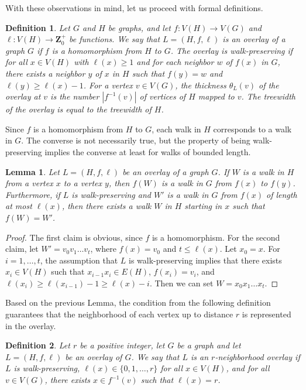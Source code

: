 \documentclass[a4paper,11pt]{article}
\newtheorem{definition}{Definition}
\newtheorem{lemma}[theorem]{Lemma}
\begin{document}
With these observations in mind, let us proceed with formal definitions.

\begin{definition}\label{def-nonp-over}
Let $G$ and $H$ be graphs, and let $f:V(H)\to V(G)$ and $\ell:V(H)\to \mathbf{Z}_0^+$ be functions.
We say that $L=(H,f,\ell)$ is an \emph{overlay} of a graph $G$ if $f$ is a homomorphism from $H$ to $G$.
The overlay is \emph{walk-preserving} if for all $x\in V(H)$ with $\ell(x)\ge 1$ and for each neighbor $w$ of $f(x)$ in $G$,
there exists a neighbor $y$ of $x$ in $H$ such that $f(y)=w$ and $\ell(y)\ge\ell(x)-1$.
For a vertex $v\in V(G)$, the \emph{thickness} $\theta_L(v)$ of the overlay at $v$ is the number $|f^{-1}(v)|$ of vertices
of $H$ mapped to $v$.  The \emph{treewidth} of the overlay is equal to the treewidth of $H$.
\end{definition}

Since $f$ is a homomorphism from $H$ to $G$, each walk in $H$ corresponds to a walk in $G$.
The converse is not necessarily true, but the property of being walk-preserving implies the converse
at least for walks of bounded length.

\begin{lemma}\label{lemma-walk}
Let $L=(H,f,\ell)$ be an overlay of a graph $G$.  If $W$ is a walk in $H$ from a vertex $x$ to a vertex $y$,
then $f(W)$ is a walk in $G$ from $f(x)$ to $f(y)$.
Furthermore, if $L$ is walk-preserving and $W'$ is a walk in $G$ from $f(x)$ of length at most $\ell(x)$, then there exists a walk $W$ in
$H$ starting in $x$ such that $f(W)=W'$.
\end{lemma}
\begin{proof}
The first claim is obvious, since $f$ is a homomorphism.  For the second claim, let $W'=v_0v_1\ldots v_t$, where $f(x)=v_0$ and $t\le \ell(x)$.
Let $x_0=x$.  For $i=1, \ldots, t$, the assumption that $L$ is walk-preserving implies that there exists $x_i\in V(H)$ such that $x_{i-1}x_i\in E(H)$,
$f(x_i)=v_i$, and $\ell(x_i)\ge\ell(x_{i-1})-1\ge \ell(x)-i$.  Then we can set $W=x_0x_1\ldots x_t$.
\end{proof}

Based on the previous Lemma, the condition from the following definition guarantees that the neighborhood
of each vertex up to distance $r$ is represented in the overlay.

\begin{definition}\label{def-over}
Let $r$ be a positive integer, let $G$ be a graph and let $L=(H,f,\ell)$ be an overlay of $G$.
We say that $L$ is an \emph{$r$-neighborhood overlay} if $L$ is walk-preserving, $\ell(x)\in\{0,1,\ldots, r\}$ for all $x\in V(H)$, and
for all $v\in V(G)$, there exists $x\in f^{-1}(v)$ such that $\ell(x)=r$.
\end{definition}
\end{document}

